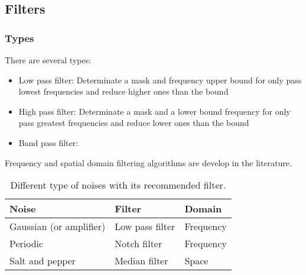 \subsection{Filters}
\subsubsection{Types}
There are several types:
\begin{itemize}
\item Low pass filter: Determinate a mask and frequency upper bound for only pass lowest frequencies and reduce higher ones than the bound 
\item High pass filter: Determinate a mask and a lower bound frequency for only pass greatest frequencies and reduce lower ones than the bound
\item Band pass filter:
\end{itemize}


Frequency and spatial domain filtering algorithms are develop in the literature.
\begin{comment}
    TODO: Agregar referencias
\end{comment}

\begin{table}[htbp]
\begin{center}
    \begin{tabular}{|l|l|l|}
        \hline
        \textbf{Noise} & \textbf{Filter} & \textbf{Domain} \\ \hline
        Gaussian (or amplifier) & Low pass filter & Frequency \\ \hline
        Periodic                & Notch filter    & Frequency \\ \hline
        Salt and pepper         & Median filter   & Space     \\ \hline
    \end{tabular}
\end{center}
\caption{Different type of noises with its recommended filter.}
\label{tab:types-noises}
\end{table}
